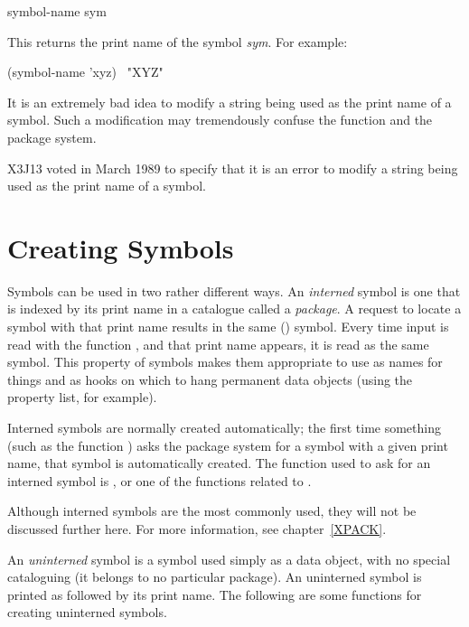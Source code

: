 \begin{defun}[Function]
symbol-name sym

This returns the print name of the symbol {\it sym}.
For example:
\begin{lisp}
(symbol-name 'xyz) \EV\ "XYZ"
\end{lisp}
It is an extremely bad idea to modify a string being used as the print name of
a symbol.  Such a modification may tremendously confuse
the function  and the package system.

\begin{newer}
X3J13 voted in March 1989 
to specify that it is an error to modify a string being used
as the print name of a symbol.
\end{newer}

\end{defun}

\section{Creating Symbols}

Symbols can be used in two rather different ways.
An {\it interned} symbol is one that is indexed by its print name
in a catalogue called a {\it package}.
A request to locate a symbol with that print name results
in the same () symbol.  Every time input is read with the
function ,
and that print name appears, it is read as the same symbol.
This property of symbols makes them appropriate to use as names for
things and as hooks on which to hang permanent data objects
(using the property list, for example).

Interned symbols are normally created automatically; the first time
something (such as the function )
asks the package system for a symbol with a given print name,
that symbol is automatically created.  The function used to ask for
an interned symbol is , or one of the functions
related to .

Although interned symbols are the most commonly
used, they will not be discussed further here.  For more information,
see chapter~\ref{XPACK}.

An {\it uninterned} symbol is a symbol used simply as a data object,
with no special cataloguing (it belongs to no particular package).
An uninterned symbol is printed as \cd{\#:} followed by its
print name.
The following are some functions for creating uninterned symbols.

